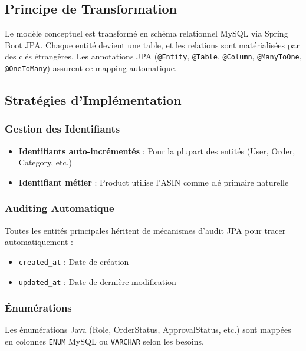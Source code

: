 \documentclass[12pt,a4paper]{report}
\begin{document}
\subsection{Principe de Transformation}

Le modèle conceptuel est transformé en schéma relationnel MySQL via Spring Boot JPA. Chaque entité devient une table, et les relations sont matérialisées par des clés étrangères. Les annotations JPA (\texttt{@Entity}, \texttt{@Table}, \texttt{@Column}, \texttt{@ManyToOne}, \texttt{@OneToMany}) assurent ce mapping automatique.

\subsection{Stratégies d'Implémentation}

\subsubsection{Gestion des Identifiants}

\begin{itemize}[noitemsep]
    \item \textbf{Identifiants auto-incrémentés} : Pour la plupart des entités (User, Order, Category, etc.)
    \item \textbf{Identifiant métier} : Product utilise l'ASIN comme clé primaire naturelle
\end{itemize}

\subsubsection{Auditing Automatique}

Toutes les entités principales héritent de mécanismes d'audit JPA pour tracer automatiquement :
\begin{itemize}[noitemsep]
    \item \texttt{created\_at} : Date de création
    \item \texttt{updated\_at} : Date de dernière modification
\end{itemize}

\subsubsection{Énumérations}

Les énumérations Java (Role, OrderStatus, ApprovalStatus, etc.) sont mappées en colonnes \texttt{ENUM} MySQL ou \texttt{VARCHAR} selon les besoins.
\end{document}
